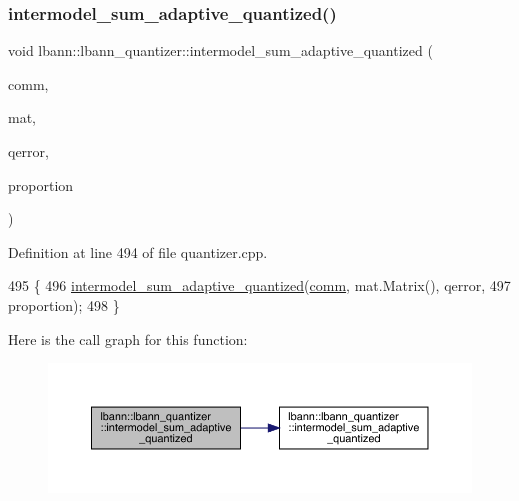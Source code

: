 \subsubsection{\texorpdfstring{intermodel\+\_\+sum\+\_\+adaptive\+\_\+quantized()}{intermodel\_sum\_adaptive\_quantized()}\hspace{0.1cm}{\footnotesize\ttfamily [2/2]}}
{\footnotesize\ttfamily void lbann\+::lbann\+\_\+quantizer\+::intermodel\+\_\+sum\+\_\+adaptive\+\_\+quantized (\begin{DoxyParamCaption}\item[{\hyperlink{classlbann_1_1lbann__comm}{lbann\+\_\+comm} $\ast$}]{comm,  }\item[{\hyperlink{base_8hpp_a0fab5387556805cfeac3e7e567bf66c5}{Dist\+Mat} \&}]{mat,  }\item[{\hyperlink{base_8hpp_a68f11fdc31b62516cb310831bbe54d73}{Mat} \&}]{qerror,  }\item[{int}]{proportion }\end{DoxyParamCaption})}



Definition at line 494 of file quantizer.\+cpp.


\begin{DoxyCode}
495                                                                \{
496   \hyperlink{classlbann_1_1lbann__quantizer_a87e856d8bf5e8a678a39cdb8f547dfd9}{intermodel\_sum\_adaptive\_quantized}(\hyperlink{file__io_8cpp_ab048c6f9fcbcfaa57ce68b00263dbebe}{comm}, mat.Matrix(), qerror,
497                                     proportion);
498 \}
\end{DoxyCode}
Here is the call graph for this function\+:\nopagebreak
\begin{figure}[H]
\begin{center}
\leavevmode
\includegraphics[width=350pt]{classlbann_1_1lbann__quantizer_aa2d4e5b9bc90f8feaaa32f3fc4183d10_cgraph}
\end{center}
\end{figure}
\mbox{\label{classlbann_1_1lbann__quantizer_a3fe3493cb16b85bd4eaf251980408f1b}} 
